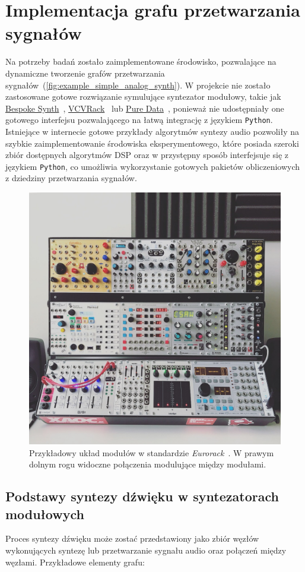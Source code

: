 \chapter{Implementacja grafu przetwarzania sygnałów}\label{dsp_graph_chapter}

Na potrzeby badań zostało zaimplementowane środowisko, pozwalające na dynamiczne tworzenie grafów przetwarzania
sygnałów~(\ref{fig:example_simple_analog_synth}). W projekcie nie zostało zastosowane gotowe rozwiązanie symulujące syntezator modułowy, takie jak
\href{https://www.bespokesynth.com/}{Bespoke Synth}~\cite{bespoke}, \href{https://vcvrack.com/Rack}{VCVRack}~\cite{vcvrack}
lub \href{https://puredata.info/}{Pure Data}~\cite{pure_data}, ponieważ
nie udostępniały one gotowego interfejsu pozwalającego na łatwą integrację z językiem \texttt{Python}.
Istniejące w internecie gotowe przykłady algorytmów syntezy audio pozwoliły na szybkie zaimplementowanie
środowiska eksperymentowego, które posiada szeroki zbiór dostępnych algorytmów DSP oraz w przystępny sposób
interfejsuje się z językiem \texttt{Python}, co umożliwia wykorzystanie gotowych pakietów obliczeniowych z dziedziny przetwarzania sygnałów.

\begin{figure}[H]\label{fig:eurorack_setup}
    \centering
    \includegraphics[width=0.4\linewidth]{rys05/eurorack.jpg}
    \caption{
      Przykładowy układ modułów w standardzie \textit{Eurorack}~\cite{eurorack}.
      W prawym dolnym rogu widoczne połączenia modulujące między modułami.
    }
\end{figure}

\section{Podstawy syntezy dźwięku w syntezatorach modułowych}

Proces syntezy dźwięku może zostać przedstawiony jako zbiór węzłów wykonujących syntezę lub
przetwarzanie sygnału audio oraz połączeń między węzłami. Przykładowe elementy grafu:

